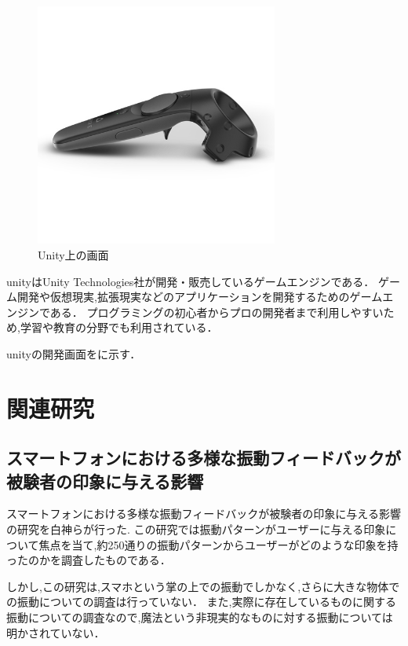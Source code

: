 \begin{figure}[h]
\centering
\includegraphics[clip,width=8cm]{./fig/vivecontroller.png}
\caption{Unity上の画面}\label{unity}
\end{figure}

unity\cite{unity}はUnity Technologies社が開発・販売しているゲームエンジンである．
ゲーム開発や仮想現実,拡張現実などのアプリケーションを開発するためのゲームエンジンである．
プログラミングの初心者からプロの開発者まで利用しやすいため,学習や教育の分野でも利用されている．

unityの開発画面をに示す．

\section{関連研究}

\subsection{スマートフォンにおける多様な振動フィードバックが被験者の印象に与える影響}
スマートフォンにおける多様な振動フィードバックが被験者の印象に与える影響\cite{smart}の研究を白神らが行った.
この研究では振動パターンがユーザーに与える印象について焦点を当て,約250通りの振動パターンからユーザーがどのような印象を持ったのかを調査したものである．


しかし,この研究は,スマホという掌の上での振動でしかなく,さらに大きな物体での振動についての調査は行っていない．
また,実際に存在しているものに関する振動についての調査なので,魔法という非現実的なものに対する振動については明かされていない．





